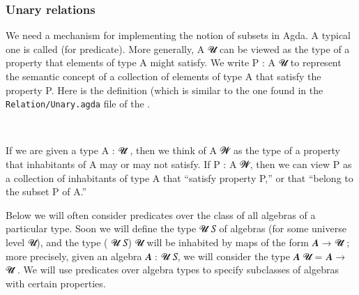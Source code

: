 \subsubsection{Unary relations}

We need a mechanism for implementing the notion of subsets in Agda. A typical one is called  (for predicate). More generally,  \ab A \ab 𝓤 can be viewed as the type of a property that elements of type \ab A might satisfy. We write \ab P \as :  \ab A \ab 𝓤 to represent the semantic concept of a collection of elements of type \ab A that satisfy the property \ab P. Here is the definition (which is similar to the one found in the \texttt{Relation/Unary.agda} file of the \agdastdlib.
\ccpad
\begin{code}%
\>[0][@{}l@{\AgdaIndent{0}}]%
\>[1]\AgdaSpace{}%
\AgdaSymbol{:}\AgdaSpace{}%
%
\AgdaSpace{}%
\AgdaSpace{}%
\AgdaSymbol{(}\AgdaSpace{}%
\AgdaSymbol{:}\AgdaSpace{}%
\AgdaSymbol{)}\AgdaSpace{}%
\AgdaSpace{}%
\AgdaSpace{}%
\AgdaSpace{}%
\AgdaSpace{}%
%
\<%
\\
%
\>[1]\AgdaSpace{}%
\AgdaSpace{}%
\AgdaSpace{}%
\AgdaSymbol{=}\AgdaSpace{}%
\AgdaSpace{}%
\AgdaSpace{}%
%
\<%
\end{code}
\ccpad
If we are given a type \ab A \as : \ab 𝓤\af ̇ , then we think of  \ab A \ab 𝓦 as the type of a property that inhabitants of \ab A may or may not satisfy. If \ab P \as :  \ab A \ab 𝓦, then we can view \ab P as a collection of inhabitants of type \ab A that ``satisfy property \ab P,'' or that ``belong to the subset \ab P of \ab A.''

Below we will often consider predicates over the class of all algebras of a particular type. Soon we will define the type  \ab 𝓤 \ab 𝑆 of algebras (for some universe level \ab 𝓤),
and the type  ( \ab 𝓤 \ab 𝑆) \ab 𝓤  %
will be inhabited by maps of the form \ab 𝑨 \as → \ab 𝓤\af ̇ ; more precisely, given an algebra \ab 𝑨 \as :  \ab 𝓤 \ab 𝑆, we will consider the type  \ab 𝑨 \ab 𝓤 \as = \ab 𝑨 \as → \ab 𝓤\af ̇ . We will use predicates over algebra types to specify subclasses of algebras with certain properties.






